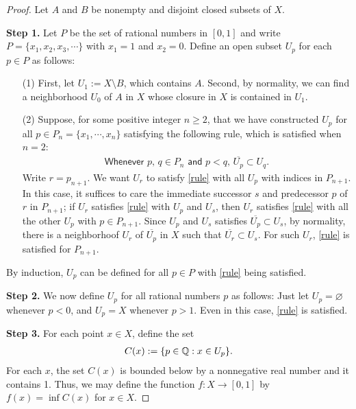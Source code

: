 \begin{proof}
    Let $A$ and $B$ be nonempty and disjoint closed subsets of $X$.

    \textbf{Step 1.}
    Let $P$ be the set of rational numbers in $[0, 1]$ and write $P=\{x_1, x_2, x_3, \cdots\}$ with $x_1=1$ and $x_2=0$.
    Define an open subset $U_p$ for each $p\in P$ as follows:
    \begin{enumerate}
        \item[(1)]
        {
            First, let $U_1:=X\setminus B$, which contains $A$.
            Second, by normality, we can find a neighborhood $U_0$ of $A$ in $X$ whose closure in $X$ is contained in $U_1$.
        }
        \item[(2)]
        {
            Suppose, for some positive integer $n\geq 2$, that we have constructed $U_p$ for all $p\in P_n=\{x_1, \cdots, x_n\}$ satisfying the following rule, which is satisfied when $n=2$:
            \begin{align}\label{rule}
                \textsf{Whenever $p,\,q\in P_n$ and $p<q$, $\overline{U_p}\subset U_q$}.
            \end{align}
            Write $r=p_{n+1}$.
            We want $U_r$ to satisfy \cref{rule} with all $U_p$ with indices in $P_{n+1}$.
            In this case, it suffices to care the immediate successor $s$ and predecessor $p$ of $r$ in $P_{n+1}$; if $U_r$ satisfies \cref{rule} with $U_p$ and $U_s$, then $U_r$ satisfies \cref{rule} with all the other $U_p$ with $p\in P_{n+1}$.
            Since $U_p$ and $U_s$ satisfies $\overline{U_p}\subset U_s$, by normality, there is a neighborhoof $U_r$ of $\overline{U_p}$ in $X$ such that $\overline{U_r}\subset U_s$.
            For such $U_r$, \cref{rule} is satisfied for $P_{n+1}$.
        }
    \end{enumerate}
    By induction, $U_p$ can be defined for all $p\in P$ with \cref{rule} being satisfied.

    \textbf{Step 2.}
    We now define $U_p$ for all rational numbers $p$ as follows: Just let $U_p=\varnothing$ whenever $p<0$, and $U_p=X$ whenever $p>1$.
    Even in this case, \cref{rule} is satisfied.
    
    \textbf{Step 3.}
    For each point $x\in X$, define the set
    \begin{align*}
        C(x):=\{p\in{\mathbb{Q}}:x\in U_p\}.
    \end{align*}
    For each $x$, the set $C(x)$ is bounded below by a nonnegative real number and it contains 1.
    Thus, we may define the function $f: X\rightarrow[0, 1]$ by $f(x)=\inf C(x)$ for $x\in X$.


\end{proof}
